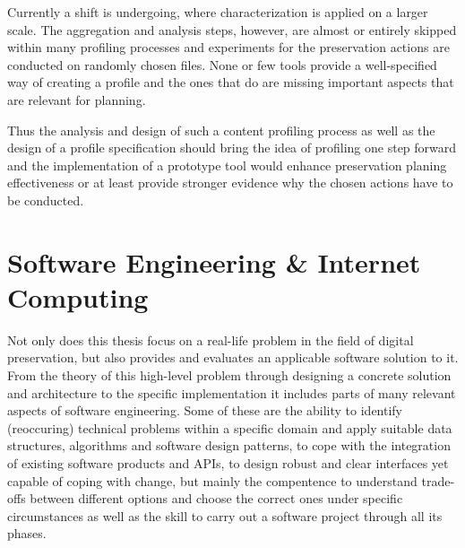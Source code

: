 \documentclass[a4paper,12pt]{scrartcl} %
\begin{document}
Currently a shift is undergoing, where characterization is applied on a larger scale. The aggregation and analysis steps, however, are almost or entirely skipped within many profiling processes and experiments for the preservation actions are conducted on randomly chosen files. None or few tools provide a well-specified way of creating a profile and the ones that do are missing important aspects that are relevant for planning.

Thus the analysis and design of such a content profiling process as well as the design of a profile specification should bring the idea of profiling one step forward and the implementation of a prototype tool would enhance preservation planing effectiveness or at least provide stronger evidence why the chosen actions have to be conducted.

\section*{Software Engineering \& Internet Computing}
Not only does this thesis focus on a real-life problem in the field of digital preservation, but also provides and evaluates an applicable software solution to it. From the theory of this high-level problem through designing a concrete solution and architecture to the specific implementation it includes parts of many relevant aspects of software engineering. Some of these are the ability to identify (reoccuring) technical problems within a specific domain and apply suitable data structures, algorithms and software design patterns, to cope with the integration of existing software products and APIs, to design robust and clear interfaces yet capable of coping with change, but mainly the compentence to understand trade-offs between different options and choose the correct ones under specific circumstances as well as the skill to carry out a software project through all its phases.



\end{document}
